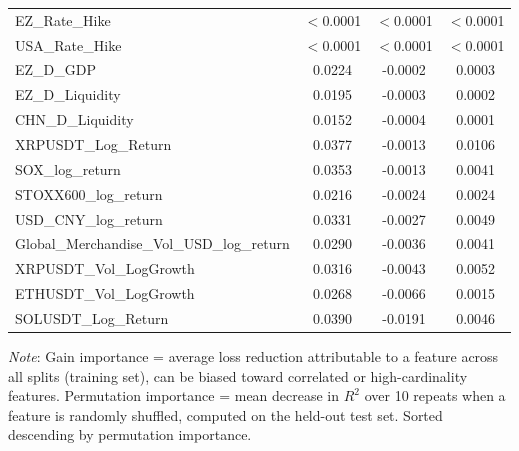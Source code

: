\begin{tabular}{lccc}
  EZ\_Rate\_Hike & $<$0.0001 & $<$0.0001 & $<$0.0001 \\ 
  USA\_Rate\_Hike & $<$0.0001 & $<$0.0001 & $<$0.0001 \\ 
  EZ\_D\_GDP & 0.0224 & -0.0002 & 0.0003 \\ 
  EZ\_D\_Liquidity & 0.0195 & -0.0003 & 0.0002 \\ 
  CHN\_D\_Liquidity & 0.0152 & -0.0004 & 0.0001 \\ 
  XRPUSDT\_Log\_Return & 0.0377 & -0.0013 & 0.0106 \\ 
  SOX\_log\_return & 0.0353 & -0.0013 & 0.0041 \\ 
  STOXX600\_log\_return & 0.0216 & -0.0024 & 0.0024 \\ 
  USD\_CNY\_log\_return & 0.0331 & -0.0027 & 0.0049 \\ 
  Global\_Merchandise\_Vol\_USD\_log\_return & 0.0290 & -0.0036 & 0.0041 \\ 
  XRPUSDT\_Vol\_LogGrowth & 0.0316 & -0.0043 & 0.0052 \\ 
  ETHUSDT\_Vol\_LogGrowth & 0.0268 & -0.0066 & 0.0015 \\ 
  SOLUSDT\_Log\_Return & 0.0390 & -0.0191 & 0.0046 \\ 
  \bottomrule
\end{tabular}
\par\vspace{4pt}
\begin{minipage}{\linewidth}
  \footnotesize \textit{Note}: Gain importance = average loss reduction attributable to a feature across all splits (training set), can be biased toward correlated or high-cardinality features. Permutation importance = mean decrease in $R^2$ over 10 repeats when a feature is randomly shuffled, computed on the held-out test set. Sorted descending by permutation importance.
\end{minipage}